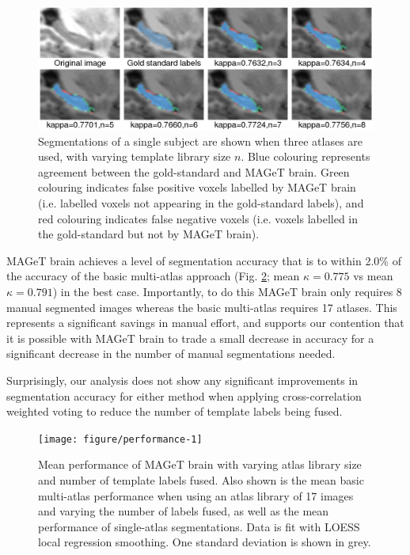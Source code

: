 \documentclass{article}\usepackage[]{graphicx}\usepackage[]{color}
\newenvironment{knitrout}{}{} %
\begin{document}
\begin{figure}[h]
\begin{minipage}[b]{1.0\linewidth}
  \centering
  \includegraphics[width=\textwidth]{montage.png}
\end{minipage}
\caption{{\small
Segmentations of a single subject are shown when three atlases are used, with
varying template library size $n$. Blue colouring represents agreement between
the gold-standard and MAGeT brain. Green colouring indicates false positive
voxels labelled by MAGeT brain (i.e. labelled voxels not appearing in the
gold-standard labels), and red colouring indicates false negative voxels (i.e.
voxels labelled in the gold-standard but not by MAGeT brain).
}} 
\label{montage}
\end{figure}

MAGeT brain achieves a level of segmentation accuracy that is to within 2.0\%
of the accuracy of the basic multi-atlas approach (Fig. \ref{results};
mean $\kappa = 0.775$ vs mean $\kappa = 0.791$) in the best case. Importantly,
to do this MAGeT brain only requires 8 manual segmented images whereas the
basic multi-atlas requires 17 atlases.  This represents a significant
savings in manual effort, and supports our contention that it is possible with
MAGeT brain to trade a small decrease in accuracy for a significant decrease in
the number of manual segmentations needed. 

Surprisingly, our analysis does not show any significant improvements in
segmentation accuracy for either method when applying cross-correlation
weighted voting to reduce the number of template labels being fused.

\begin{figure}[t]
  \centering
\begin{knitrout}
\color{fgcolor}
\texttt{[image: figure/performance-1]} 

\end{knitrout}
\caption{{\small
Mean performance of MAGeT brain with varying atlas library size and number of
template labels fused. Also shown is the mean basic multi-atlas
performance when using an atlas library of 17 images and varying the number of
labels fused, as well as the mean performance of single-atlas segmentations.
Data is fit with LOESS local regression smoothing. One standard deviation is
shown in grey.
}}
\label{results}
\end{figure}
\end{document}
